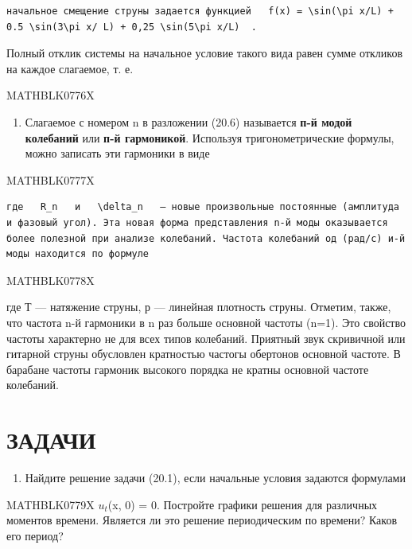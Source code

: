 \documentclass[
]{article}
\providecommand{\tightlist}{%
  \setlength{\itemsep}{0pt}\setlength{\parskip}{0pt}}
\begin{document}
{{\begin{verbatim}
начальное смещение струны задается функцией   f(x) = \sin(\pi x/L) + 0.5 \sin(3\pi x/ L) + 0,25 \sin(5\pi x/L)  .
\end{verbatim}

Полный отклик системы на начальное условие такого вида равен сумме
откликов на каждое слагаемое, т. е.

MATHBLK0776X

\begin{enumerate}
\def\labelenumi{\arabic{enumi}.}
\setcounter{enumi}{1}
\tightlist
\item
  Слагаемое с номером n в разложении (20.6) называется \textbf{п-й модой
  колебаний} или \textbf{п-й гармоникой}. Используя тригонометрические
  формулы, можно записать эти гармоники в виде
\end{enumerate}

MATHBLK0777X

\begin{verbatim}
где   R_n   и   \delta_n   — новые произвольные постоянные (амплитуда и фазовый угол). Эта новая форма представления n-й моды оказывается более полезной при анализе колебаний. Частота колебаний од (рад/с) и-й моды находится по формуле
\end{verbatim}

MATHBLK0778X

где Т --- натяжение струны, р --- линейная плотность струны. Отметим,
также, что частота n-й гармоники в n раз больше основной частоты (n=1).
Это свойство частоты характерно не для всех типов колебаний. Приятный
звук скривичной или гитарной струны обусловлен кратностью частогы
обертонов основной частоте. В барабане частоты гармоник высокого порядка
не кратны основной частоте колебаний.

\section{ЗАДАЧИ}\label{ux437ux430ux434ux430ux447ux438-5}

\begin{enumerate}
\def\labelenumi{\arabic{enumi}.}
\tightlist
\item
  Найдите решение задачи (20.1), если начальные условия задаются
  формулами
\end{enumerate}

MATHBLK0779X \(u_t\)(x, 0) = 0. Постройте графики решения для различных
моментов времени. Является ли это решение периодическим по времени?
Каков его период?

}}
\end{document}
